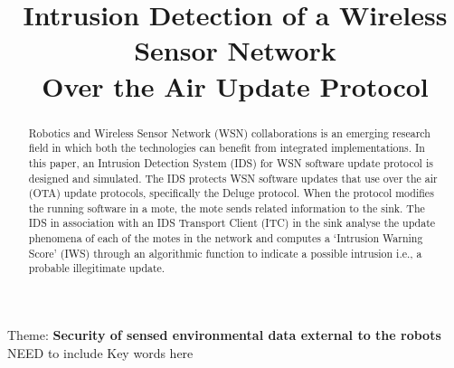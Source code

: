 \documentclass[conference,manuscript]{IEEEtran}
\begin{document}
\title{Intrusion Detection of a Wireless Sensor Network\\Over the Air Update Protocol}

\author{
}



\maketitle


\begin{abstract}
Robotics and  Wireless Sensor Network (WSN) collaborations is an emerging research field in which both the technologies can benefit from integrated implementations.
In this paper, an Intrusion Detection System (IDS) for WSN  software update protocol is designed and simulated. 
The IDS protects WSN software updates that use over the air (OTA) update protocols, specifically the Deluge protocol.
When the protocol modifies the running software in a mote, the mote sends related  information to the sink. 
The IDS in association with an IDS Transport Client (ITC) in the sink analyse the update phenomena of each of the motes in the network and computes a `Intrusion Warning Score' (IWS) through an algorithmic function to indicate a possible intrusion i.e., a probable illegitimate update.
\end{abstract}

Theme: \textbf{Security of sensed environmental data external to the robots}\\
NEED to include Key words here\\


%
\IEEEpeerreviewmaketitle %
\end{document}
